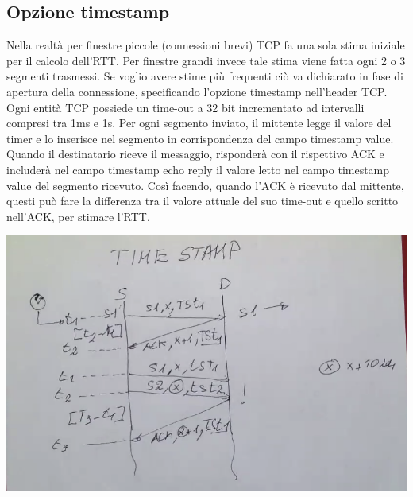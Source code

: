 \documentclass[11pt, oneside]{article}   	%
\begin{document}
\subsection*{Opzione timestamp}
Nella realtà per finestre piccole (connessioni brevi) TCP fa una sola stima iniziale per il calcolo dell'RTT. Per finestre grandi invece tale stima viene fatta ogni 2 o 3 segmenti trasmessi. Se voglio avere stime più frequenti ciò va dichiarato in fase di apertura della connessione, specificando l'opzione timestamp nell'header TCP.\\
Ogni entità TCP possiede un time-out a 32 bit incrementato ad intervalli compresi tra 1ms e 1s. Per ogni segmento inviato, il mittente legge il valore del timer e lo inserisce nel segmento in corrispondenza del campo timestamp value.\\
Quando il destinatario riceve il messaggio, risponderà con il rispettivo ACK e includerà nel campo timestamp echo reply il valore letto nel campo timestamp value del segmento ricevuto. Così facendo, quando l'ACK è ricevuto dal mittente, questi può fare la differenza tra il valore attuale del suo time-out e quello scritto nell'ACK, per stimare l'RTT.
\begin{center}
\includegraphics[scale=0.5]{timestamp}
\end{center}
\
\end{document}

